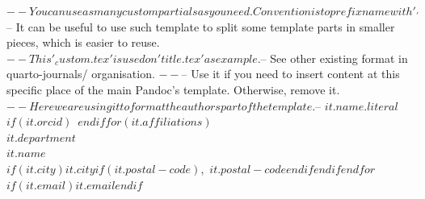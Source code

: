 
$-- You can use as many custom partials as you need. Convention is to prefix name with '_'
$-- It can be useful to use such template to split some template parts in smaller pieces, which is easier to reuse.
$-- This '_custom.tex' is used on 'title.tex' as example.
$-- See other existing format in quarto-journals/ organisation.
$-- %
$-- Use it if you need to insert content at this specific place of the main Pandoc's template. Otherwise, remove it.
$-- Here we are using it to format the authors part of the template.
$-- %
\textbf{$it.name.literal$}$if(it.orcid)$~$endif$$for(it.affiliations)$\\$it.department$\\$it.name$\\$if(it.city)$$it.city$$if(it.postal-code)$,\ $it.postal-code$$endif$$endif$$endfor$\\$if(it.email)$\href{mailto:$it.email$}{$it.email$}$endif$
